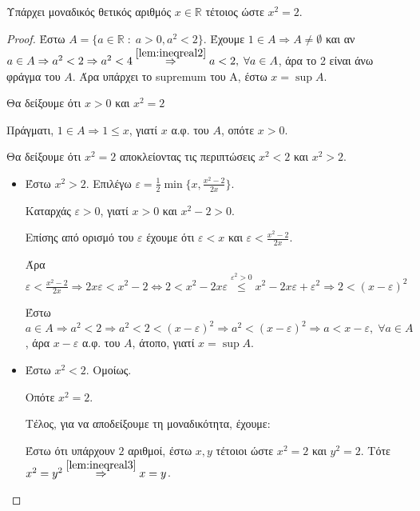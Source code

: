 \documentclass[main.tex]{subfiles}
\begin{document}
\begin{thm}
    Υπάρχει μοναδικός θετικός αριθμός $ x \in \mathbb{R} $ τέτοιος ώστε $ x^{2}=2 $.
\end{thm}

\begin{proof}
\item {}
    Έστω $ A = \{ a \in \mathbb{R} \; : \; a > 0, a^{2} < 2 \}  $. Έχουμε $ 1 \in A 
    \Rightarrow A \neq \emptyset $ 
    και αν $ a \in A \Rightarrow a^{2} < 2 \Rightarrow a^{2} < 4
    \overset{\ref{lem:ineqreal2}}{\Rightarrow} a <2,\; \forall a \in A $, 
    άρα το 2 είναι άνω φράγμα του $A$. Άρα υπάρχει το supremum του Α, έστω 
    $ x = \sup A $. 

    Θα δείξουμε ότι $ x > 0 $ και $ x^{2} = 2 $

    Πράγματι, $ 1 \in A \Rightarrow 1 \leq x $, γιατί $x$ α.φ. του $A$, οπότε $ x >0 $.

    Θα δείξουμε ότι $ x^{2} = 2 $ αποκλείοντας τις περιπτώσεις $ x^{2} <2 $ και 
    $ x^{2} > 2 $.
    \begin{itemize}
        \item Έστω $ x^{2} > 2 $. Επιλέγω $ \varepsilon = \frac{1}{2} \min \{ x, 
            \frac{x^{2}-2}{2x}\} $.

            Καταρχάς $ \varepsilon > 0 $, γιατί $ x>0 $ και $ x^{2} -2 >0 $. 

            Επίσης από ορισμό του $ \varepsilon $ έχουμε ότι  $\varepsilon < x $ και 
            $ \varepsilon < \frac{x^{2}-2}{2x}$. 

            Άρα $ \varepsilon < \frac{x^{2}-2}{2x} \Rightarrow 
            2x \varepsilon < x^{2} - 2 \Leftrightarrow 2 < x^{2} -2x \varepsilon 
            \overset{\varepsilon ^{2}>0}{\leq}
            x^{2} -2x \varepsilon + \varepsilon ^{2} \Rightarrow 2 
            < (x- \varepsilon )^{2}   $

            Έστω $ a \in A \Rightarrow a^{2} <2 \Rightarrow a^{2}<2< 
            (x- \varepsilon )^{2} \Rightarrow a^{2}< (x- \varepsilon )^{2} 
            \Rightarrow a < x- \varepsilon, \; \forall a \in A$, 
            άρα $ x - \varepsilon $ α.φ. του $A$, άτοπο, γιατί $ x= \sup A $.

        \item Έστω $ x^{2}<2 $. Ομοίως.

            Οπότε $ x^{2}=2 $. 

            Τέλος, για να αποδείξουμε τη μοναδικότητα, έχουμε:

            Έστω ότι υπάρχουν $ 2 $ αριθμοί, έστω $ x,y $ τέτοιοι ώστε $ x^{2} =2 $ 
            και $ y^{2}=2 $. Τότε $ x^{2}=y^{2} \overset{\ref{lem:ineqreal3}}
            {\Rightarrow} x =y $.
    \end{itemize}
\end{proof}
\end{document}
